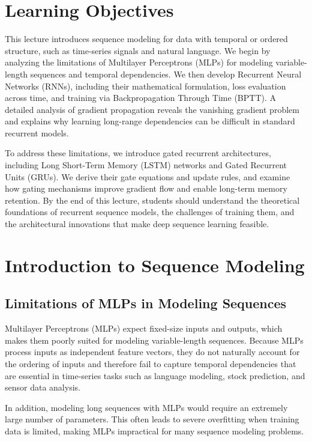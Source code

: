 \documentclass{article}
\begin{document}
\section{Learning Objectives}

This lecture introduces sequence modeling for data with temporal or ordered structure, such as time-series signals and natural language. We begin by analyzing the limitations of Multilayer Perceptrons (MLPs) for modeling variable-length sequences and temporal dependencies. We then develop Recurrent Neural Networks (RNNs), including their mathematical formulation, loss evaluation across time, and training via Backpropagation Through Time (BPTT). A detailed analysis of gradient propagation reveals the vanishing gradient problem and explains why learning long-range dependencies can be difficult in standard recurrent models.

To address these limitations, we introduce gated recurrent architectures, including Long Short-Term Memory (LSTM) networks and Gated Recurrent Units (GRUs). We derive their gate equations and update rules, and examine how gating mechanisms improve gradient flow and enable long-term memory retention. By the end of this lecture, students should understand the theoretical foundations of recurrent sequence models, the challenges of training them, and the architectural innovations that make deep sequence learning feasible.


\section{Introduction to Sequence Modeling}

\subsection*{Limitations of MLPs in Modeling Sequences}

Multilayer Perceptrons (MLPs) expect fixed-size inputs and outputs, which makes them poorly suited for modeling variable-length sequences. Because MLPs process inputs as independent feature vectors, they do not naturally account for the ordering of inputs and therefore fail to capture temporal dependencies that are essential in time-series tasks such as language modeling, stock prediction, and sensor data analysis. 

In addition, modeling long sequences with MLPs would require an extremely large number of parameters. This often leads to severe overfitting when training data is limited, making MLPs impractical for many sequence modeling problems.
\end{document}
